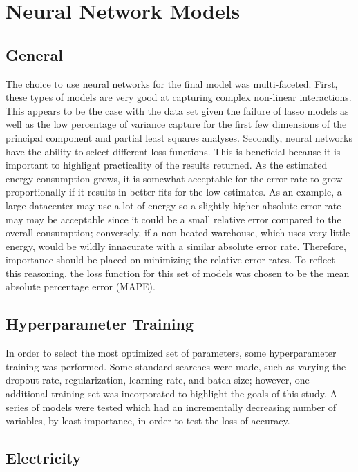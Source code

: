 
\section{Neural Network Models}
\label{sec:nn_models}

\subsection{General}
The choice to use neural networks for the final model was multi-faceted.  First, these types of models are very good at capturing complex non-linear interactions.  This appears to be the case with the data set given the failure of lasso models as well as the low percentage of variance capture for the first few dimensions of the principal component and partial least squares analyses.  Secondly, neural networks have the ability to select different loss functions.  This is beneficial because it is important to highlight practicality of the results returned.  As the estimated energy consumption grows, it is somewhat acceptable for the error rate to grow proportionally if it results in better fits for the low estimates.  As an example, a large datacenter may use a lot of energy so a slightly higher absolute error rate may may be acceptable since it could be a small relative error compared to the overall consumption; conversely, if a non-heated warehouse, which uses very little energy, would be wildly innacurate with a similar absolute error rate.  Therefore, importance should be placed on minimizing the relative error rates.  To reflect this reasoning, the loss function for this set of models was chosen to be the mean absolute percentage error (MAPE).

\subsection{Hyperparameter Training}
In order to select the most optimized set of parameters, some hyperparameter training was performed.  Some standard searches were made, such as varying the dropout rate, regularization, learning rate, and batch size; however, one additional training set was incorporated to highlight the goals of this study.  A series of models were tested which had an incrementally decreasing number of variables, by least importance, in order to test the loss of accuracy.

\subsection{Electricity}
